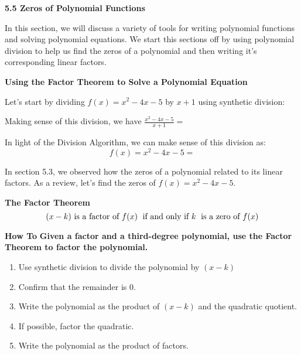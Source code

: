 \documentclass[12pt]{book}
\newcommand{\D}{\displaystyle}
\begin{document}
{\Large \textbf{5.5 Zeros of Polynomial Functions}}
\vspace{1mm}

In this section, we will discuss a variety of tools for writing polynomial functions and solving polynomial equations. We start this sections off by using polynomial division to help us find the zeros of a polynomial and then writing it's corresponding linear factors.
\vspace{3mm}

{\large \textbf{Using the Factor Theorem to Solve a Polynomial Equation}}


Let's start by dividing $f(x) =x^2-4x-5$ by $x+1$ using synthetic division: 

\vspace{60mm}

Making sense of this division, we have $\D \frac{x^2-4x-5}{x+1}=$

\vspace{10mm}
In light of the Division Algorithm, we can make sense of this division as:
$$f(x) = x^2-4x-5=$$

\vspace{5mm}


In section 5.3, we observed how the zeros of a polynomial related to its linear factors. As a review, let's find the zeros of $f(x)=x^2-4x-5$.
\vspace{45mm}
\begin{boxR}
   \textbf{The Factor Theorem}
    \vspace{1mm}
    \hline
    \vspace{2mm}
    $$ (x-k) \text{ is a factor of } f(x) \hspace{1mm} \text{ if and only if }  k \hspace{1mm} \text{ is a zero of } f(x)$$
\end{boxR}



\newpage



\begin{boxR}
    \textbf{How To}
    \vspace{1mm}
    \hline
    \vspace{2mm}
\textbf{Given a factor and a third-degree polynomial, use the Factor Theorem to factor the polynomial.}

\begin{enumerate}
    \item Use synthetic division to divide the polynomial by $(x-k)$
    \item Confirm that the remainder is $0$.
    \item Write the polynomial as the product of $(x-k)$
  and the quadratic quotient.
    \item If possible, factor the quadratic.
    \item Write the polynomial as the product of factors.  
\end{enumerate}
\end{boxR}
\end{document}

